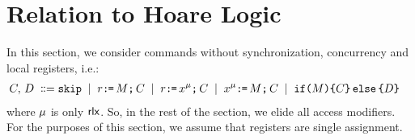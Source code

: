 


\newcommand{\aMem}{M}
\newcommand{\bMem}{N}
\newcommand{\upd}[3]{#1[#2 \mapsto #3]}
\newcommand{\aStore}{S}
\newcommand{\bStore}{T}
\newcommand{\config}[3]{((#1,#2), #3)}
\newcommand{\aConfig}{\config{\aMem}{\aStore}{\aCmd}}
\newcommand{\bConfig}{\config{\bMem}{\bStore}{\bCmd}}
\newcommand{\trans}{\xrightarrow}
\newcommand{\configCmd}[1]{\aCmd_{#1}}
\newcommand{\aconfigCmd}[1]{{\rm Cmd}_{\aConfig}}
\newcommand{\aConfigV}{{\mathcal C}}
\newcommand{\bConfigV}{{\mathcal D}}
\newcommand{\seqsem}[1]{{\rm SEQ}\sem{#1}}

\section{Relation to Hoare Logic}
In this section, we consider commands without synchronization, concurrency and local registers, i.e.:
\begin{align*}
C,\,D
\;\mathrel{\mathord{\vcentcolon}\mkern-1mu\mathord{\vcentcolon}\mathord{{=}}}\;& \texttt{skip}
\;\mathrel{|}\; r\texttt{:}\mkern-1mu\texttt{=}\,M\texttt{;}\,\allowbreak C
\;\mathrel{|}\; r\texttt{:}\mkern-1mu\texttt{=}\,x^{\mu}\texttt{;}\,\allowbreak C 
\;\mathrel{|}\; x^{\mu}\texttt{:}\mkern-1mu\texttt{=}\,M\texttt{;}\,\allowbreak C
\;\mathrel{|}\; \texttt{if}\allowbreak\texttt{(}M\texttt{)} \allowbreak\texttt{\{} C \texttt{\}}\,\allowbreak\texttt{else}\allowbreak\,\texttt{\{} D \texttt{\}}
\end{align*}
where $\mu$ is only ${\mathsf{rlx}}$.  So, in the rest of the section, we elide all access modifiers.  
For the purposes of this section, we assume that registers are single assignment.   

